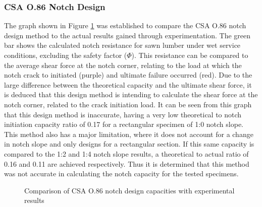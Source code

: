 \documentclass[11pt,a4paper]{article}
\numberwithin{equation}{subsection}
\begin{document}
\subsubsection{CSA O.86 Notch Design}
The graph shown in Figure \ref{fig:CSA} was established to compare the CSA O.86 notch design method to the actual results gained through experimentation. The green bar shows the calculated notch resistance for sawn lumber under wet service conditions, excluding the safety factor ($\Phi$). This resistance can be compared to the average shear force at the notch corner, relating to the load at which the notch crack to initiated (purple) and ultimate failure occurred (red). Due to the large difference between the theoretical capacity and the ultimate shear force, it is deduced that this design method is intending to calculate the shear force at the notch corner, related to the crack initiation load. It can be seen from this graph that this design method is inaccurate, having a very low theoretical to notch initiation capacity ratio of 0.17 for a rectangular specimen of 1:0 notch slope. This method also has a major limitation, where it does not account for a change in notch slope and only designs for a rectangular section. If this same capacity is compared to the 1:2 and 1:4 notch slope results, a theoretical to actual ratio of 0.16 and 0.11 are achieved respectively. Thus it is determined that this method was not accurate in calculating the notch capacity for the tested specimens.

\vspace*{\baselineskip}

\begin{figure}[h]
	\begin{center}
	\end{center}
	\caption{Comparison of CSA O.86 notch design capacities with experimental results}
	\label{fig:CSA}
\end{figure}
\end{document}
